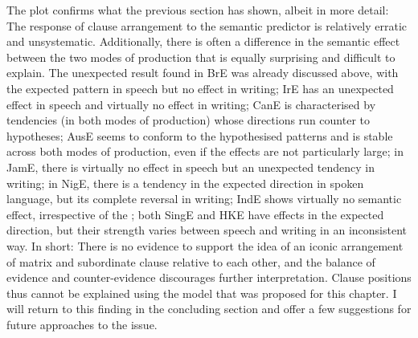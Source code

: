 The plot confirms what the previous section has shown, albeit in more detail: The response of clause arrangement to the semantic predictor is relatively erratic and unsystematic. Additionally, there is often a difference in the semantic effect between the two modes of production that is equally surprising and difficult to explain. The unexpected result found in BrE was already discussed above, with the expected pattern in speech but no effect in writing; IrE has an unexpected effect in speech and virtually no effect in writing; CanE is characterised by tendencies (in both modes of production) whose directions run counter to hypotheses; AusE seems to conform to the hypothesised patterns and is stable across both modes of production, even if the effects are not particularly large; in JamE, there is virtually no effect in speech but an unexpected tendency in writing; in NigE, there is a tendency in the expected direction in spoken language, but its complete reversal in writing; IndE shows virtually no semantic effect, irrespective of the ; both SingE and HKE have effects in the expected direction, but their strength varies between speech and writing in an inconsistent way. In short: There is no evidence to support the idea of an iconic arrangement of matrix and subordinate clause relative to each other, and the balance of evidence and counter-evidence discourages further interpretation. Clause positions thus cannot be explained using the model that was proposed for this chapter. I will return to this finding in the concluding section and offer a few suggestions for future approaches to the issue.

